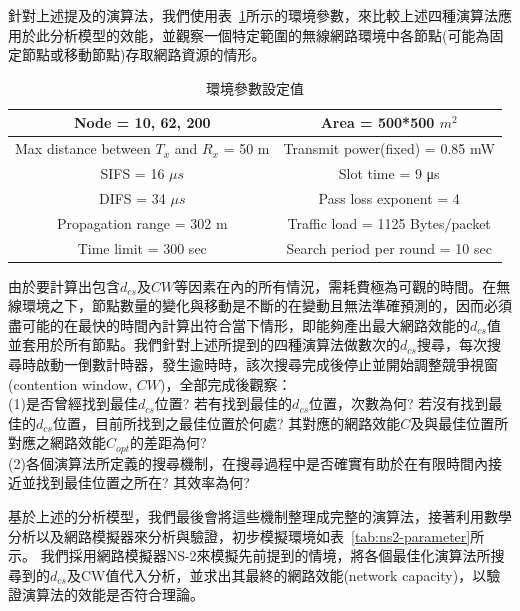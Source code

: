 \documentclass[12pt,a4paper]{article}
\newcommand{\Tab}[1]{表~\ref{#1}}
\begin{document}
\begin{description}
\begin{enumerate}
針對上述提及的演算法，我們使用\Tab{tab:env-parameter}所示的環境參數，來比較上述四種演算法應用於此分析模型的效能，並觀察一個特定範圍的無線網路環境中各節點(可能為固定節點或移動節點)存取網路資源的情形。

\begin{table}[!htb]
\centering
\caption{環境參數設定值}
\vspace{0.2cm}
\small
\begin{tabular}{|c|c|}
\hline
Node = 10, 62, 200 & Area = 500*500 $m^2$ \\
\hline
Max distance between $T_x$ and $R_x$ = 50 m & Transmit power(fixed) = 0.85 mW \\
\hline
SIFS = 16 $\mu s$ & Slot time = 9 μs \\
\hline
DIFS = 34 $\mu s$ & Pass loss exponent = 4 \\
\hline
Propagation range = 302 m & Traffic load = 1125 Bytes$/$packet\\
\hline
Time limit = 300 sec & Search period per round = 10 sec\\
\hline
\end{tabular}
\label{tab:env-parameter}
\end{table}

由於要計算出包含$d_{cs}$及$CW$等因素在內的所有情況，需耗費極為可觀的時間。在無線環境之下，節點數量的變化與移動是不斷的在變動且無法準確預測的，因而必須盡可能的在最快的時間內計算出符合當下情形，即能夠產出最大網路效能的$d_{cs}$值並套用於所有節點。我們針對上述所提到的四種演算法做數次的$d_{cs}$搜尋，每次搜尋時啟動一倒數計時器，發生逾時時，該次搜尋完成後停止並開始調整競爭視窗(contention window, $CW$)，全部完成後觀察：\\
(1)是否曾經找到最佳$d_{cs}$位置? 若有找到最佳的$d_{cs}$位置，次數為何? 若沒有找到最佳的$d_{cs}$位置，目前所找到之最佳位置於何處? 其對應的網路效能$C$及與最佳位置所對應之網路效能$C_{opt}$的差距為何? \\
(2)各個演算法所定義的搜尋機制，在搜尋過程中是否確實有助於在有限時間內接近並找到最佳位置之所在? 其效率為何?

基於上述的分析模型，我們最後會將這些機制整理成完整的演算法，接著利用數學分析以及網路模擬器來分析與驗證，初步模擬環境如\Tab{tab:ns2-parameter}所示。
我們採用網路模擬器NS-2來模擬先前提到的情境，將各個最佳化演算法所搜尋到的$d_{cs}$及CW值代入分析，並求出其最終的網路效能(network capacity)，以驗證演算法的效能是否符合理論。\\




\end{enumerate}
\end{description}
\end{document}
